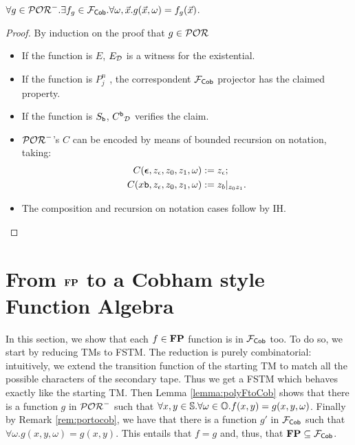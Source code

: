 \begin{remark}
  \label{rem:portocob}
  $\forall g \in\mathcal{POR}^-.\exists f_g\in \mathcal{F}_{\mathsf{Cob}}.
  \forall \omega, \vec x. g(\vec x, \omega)=f_g(\vec x)$.
\end{remark}
\begin{proof}
  By induction on the proof that $g\in \mathcal{POR}$

  \begin{itemize}
    \item If the function is $E$, ${E}_{\mathcal{D}}$ is a witness for the existential.
    \item If the function is ${P^n_j}$ , the correspondent $\mathcal{F}_{\mathsf{Cob}}$
    projector has the claimed property.
    \item If the function is $S_{\mathtt{b}}$, ${C^{\mathtt{b}}}_{\mathcal{D}}$ verifies the claim.
    \item $\mathcal{POR}^-$'s $C$ can be encoded by means of bounded recursion on notation, taking:
    \begin{align*}
    C(\bm{\epsilon}, z_\epsilon, z_0, z_1, \omega) &:= z_\epsilon;\\
    C(x\mathtt{b}, z_\epsilon, z_0, z_1, \omega) &:= z_b|_{z_0z_1}.
  \end{align*}
    \item The composition and recursion on notation cases
    follow by IH.
  \end{itemize}
\end{proof}


\section{From $\mathbf{FP}$ to a Cobham style Function Algebra}
\label{sec:polyFcompleteness}

In this section, we show that each $f \in \mathbf{FP}$ function is in $\mathcal{F}_{\mathsf{Cob}}$ too.
To do so, we start by reducing TMs to FSTM.
The reduction is purely combinatorial:
intuitively, we extend the transition function
of the starting TM to match all the possible characters
of the secondary tape. Thus we get a FSTM which behaves
exactly like
the starting TM. Then Lemma \ref{lemma:polyFtoCob} shows that
there is a function $g$ in $\mathcal{POR}^-$ such that
$\forall x, y \in \mathbb{S}. \forall \omega \in \mathbb{O}. f(x, y)= g(x, y, \omega)$.
Finally by Remark \ref{rem:portocob}, we have that there is a function $g'$ in $\mathcal{F}_{\mathsf{Cob}}$
such that $\forall \omega. g(x, y, \omega)= g(x, y)$. This entails that $f=g$ and,
thus, that $\mathbf{FP} \subseteq \mathcal{F}_{\mathsf{Cob}}$.

